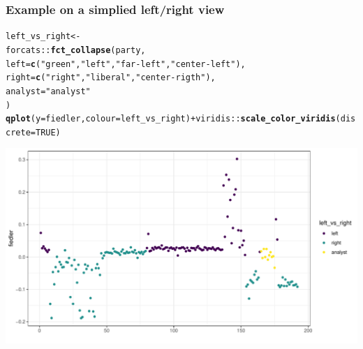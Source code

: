 \documentclass{beamer}\usepackage[]{graphicx}\usepackage[]{color}
\makeatletter
\newcommand{\hlnum}[1]{\textcolor[rgb]{0.686,0.059,0.569}{#1}}%
\newcommand{\hlstr}[1]{\textcolor[rgb]{0.192,0.494,0.8}{#1}}%
\newcommand{\hlopt}[1]{\textcolor[rgb]{0,0,0}{#1}}%
\newcommand{\hlstd}[1]{\textcolor[rgb]{0.345,0.345,0.345}{#1}}%
\newcommand{\hlkwb}[1]{\textcolor[rgb]{0.69,0.353,0.396}{#1}}%
\newcommand{\hlkwc}[1]{\textcolor[rgb]{0.333,0.667,0.333}{#1}}%
\newcommand{\hlkwd}[1]{\textcolor[rgb]{0.737,0.353,0.396}{\textbf{#1}}}%
\newenvironment{kframe}{%
 \def\at@end@of@kframe{}%
 \ifinner\ifhmode%
  \def\at@end@of@kframe{\end{minipage}}%
  \begin{minipage}{\columnwidth}%
 \fi\fi%
 \def\FrameCommand##1{\hskip\@totalleftmargin \hskip-\fboxsep
 \colorbox{shadecolor}{##1}\hskip-\fboxsep
     \hskip-\linewidth \hskip-\@totalleftmargin \hskip\columnwidth}%
 \MakeFramed {\advance\hsize-\width
   \@totalleftmargin\z@ \linewidth\hsize
   \@setminipage}}%
 {\par\unskip\endMakeFramed%
 \at@end@of@kframe}
\newenvironment{knitrout}{}{} %
\makeatother
\begin{document}
\begin{frame}[fragile]
  \frametitle{Example on a simplied left/right view}

\begin{knitrout}\scriptsize
{}\color{fgcolor}\begin{kframe}
\begin{alltt}
\hlstd{left_vs_right} \hlkwb{<-}
  \hlstd{forcats}\hlopt{::}\hlkwd{fct_collapse}\hlstd{(party,}
    \hlkwc{left} \hlstd{=} \hlkwd{c}\hlstd{(}\hlstr{"green"}\hlstd{,} \hlstr{"left"}\hlstd{,} \hlstr{"far-left"}\hlstd{,} \hlstr{"center-left"}\hlstd{),}
    \hlkwc{right} \hlstd{=} \hlkwd{c}\hlstd{(}\hlstr{"right"}\hlstd{,} \hlstr{"liberal"}\hlstd{,} \hlstr{"center-rigth"}\hlstd{),}
    \hlkwc{analyst} \hlstd{=} \hlstr{"analyst"}
  \hlstd{)}
\hlkwd{qplot}\hlstd{(}\hlkwc{y} \hlstd{= fiedler,} \hlkwc{colour} \hlstd{= left_vs_right)} \hlopt{+}  \hlstd{viridis}\hlopt{::}\hlkwd{scale_color_viridis}\hlstd{(}\hlkwc{discrete} \hlstd{=} \hlnum{TRUE}\hlstd{)}
\end{alltt}
\end{kframe}
\includegraphics[width=.8\textwidth]{figures/unnamed-chunk-5-1} 
\end{knitrout}


\end{frame}
\end{document}
